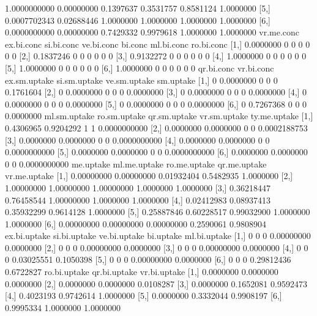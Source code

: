 \begin{Schunk}
\begin{Soutput}
[4,] 1.0000000000 0.00000000 0.1397637  0.3531757  0.8581124  1.0000000
[5,] 0.0007702343 0.02688446 1.0000000  1.0000000  1.0000000  1.0000000
[6,] 0.0000000000 0.00000000 0.7429332  0.9979618  1.0000000  1.0000000
     vr.me.conc ex.bi.conc si.bi.conc ve.bi.conc bi.conc ml.bi.conc ro.bi.conc
[1,]  0.0000000          0          0          0       0          0          0
[2,]  0.1837246          0          0          0       0          0          0
[3,]  0.9132272          0          0          0       0          0          0
[4,]  1.0000000          0          0          0       0          0          0
[5,]  1.0000000          0          0          0       0          0          0
[6,]  1.0000000          0          0          0       0          0          0
     qr.bi.conc vr.bi.conc ex.sm.uptake si.sm.uptake ve.sm.uptake sm.uptake
[1,]          0  0.0000000            0            0            0 0.1761604
[2,]          0  0.0000000            0            0            0 0.0000000
[3,]          0  0.0000000            0            0            0 0.0000000
[4,]          0  0.0000000            0            0            0 0.0000000
[5,]          0  0.0000000            0            0            0 0.0000000
[6,]          0  0.7267368            0            0            0 0.0000000
     ml.sm.uptake ro.sm.uptake qr.sm.uptake vr.sm.uptake ty.me.uptake
[1,]    0.4306965    0.9204292            1            1 0.0000000000
[2,]    0.0000000    0.0000000            0            0 0.0002188753
[3,]    0.0000000    0.0000000            0            0 0.0000000000
[4,]    0.0000000    0.0000000            0            0 0.0000000000
[5,]    0.0000000    0.0000000            0            0 0.0000000000
[6,]    0.0000000    0.0000000            0            0 0.0000000000
      me.uptake ml.me.uptake ro.me.uptake qr.me.uptake vr.me.uptake
[1,] 0.00000000   0.00000000   0.01932404    0.5482935    1.0000000
[2,] 1.00000000   1.00000000   1.00000000    1.0000000    1.0000000
[3,] 0.36218447   0.76458544   1.00000000    1.0000000    1.0000000
[4,] 0.02412983   0.08937413   0.35932299    0.9614128    1.0000000
[5,] 0.25887846   0.60228517   0.99032900    1.0000000    1.0000000
[6,] 0.00000000   0.00000000   0.00000000    0.2590061    0.9808904
     ex.bi.uptake si.bi.uptake ve.bi.uptake  bi.uptake ml.bi.uptake
[1,]            0            0            0 0.00000000    0.0000000
[2,]            0            0            0 0.00000000    0.0000000
[3,]            0            0            0 0.00000000    0.0000000
[4,]            0            0            0 0.03025551    0.1050398
[5,]            0            0            0 0.00000000    0.0000000
[6,]            0            0            0 0.29812436    0.6722827
     ro.bi.uptake qr.bi.uptake vr.bi.uptake
[1,]    0.0000000    0.0000000    0.0000000
[2,]    0.0000000    0.0000000    0.0108287
[3,]    0.0000000    0.1652081    0.9592473
[4,]    0.4023193    0.9742614    1.0000000
[5,]    0.0000000    0.3332044    0.9908197
[6,]    0.9995334    1.0000000    1.0000000
\end{Soutput}
%
% --end: "pbld2"
\end{Schunk}
